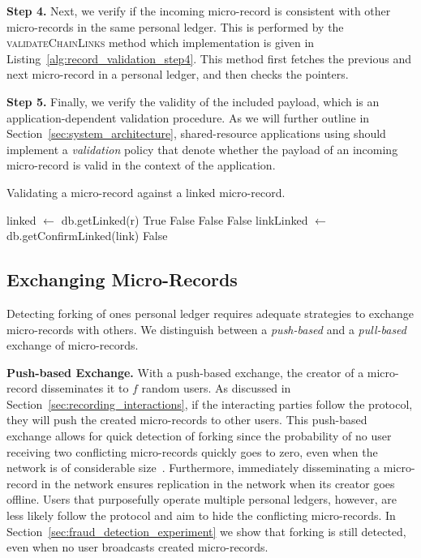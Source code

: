 \textbf{Step 4.}
Next, we verify if the incoming micro-record is consistent with other micro-records in the same personal ledger.
This is performed by the \textsc{validateChainLinks} method which implementation is given in Listing~\ref{alg:record_validation_step4}.
This method first fetches the previous and next micro-record in a personal ledger, and then checks the pointers.

\textbf{Step 5.}
Finally, we verify the validity of the included payload, which is an application-dependent validation procedure.
As we will further outline in Section~\ref{sec:system_architecture}, shared-resource applications using \ModelName{} should implement a \emph{validation} policy that denote whether the payload of an incoming micro-record is valid in the context of the application.

\begin{algorithm}[t]
	\label{alg:record_validation_step3}
	\caption{Validating a micro-record against a linked micro-record.}
	\begin{algorithmic}[1]
		  
		\State linked $ \leftarrow$ db.getLinked(r)
		\State \Return True
		\EndIf
		\State \Return False
		\EndIf
		\State \Return False
		\EndIf
		\State \Return False
		\EndIf
		\State linkLinked $ \leftarrow $ db.getConfirmLinked(link)
		\State \Return False
		\EndIf
		\EndIf
		\EndProcedure
	\end{algorithmic}
\end{algorithm}

\subsection{Exchanging Micro-Records}
\label{sec:exchanging_records}
Detecting forking of ones personal ledger requires adequate strategies to exchange micro-records with others.
We distinguish between a \emph{push-based} and a \emph{pull-based} exchange of micro-records.

\textbf{Push-based Exchange.}
With a push-based exchange, the creator of a micro-record disseminates it to $ f $ random users.
As discussed in Section~\ref{sec:recording_interactions}, if the interacting parties follow the protocol, they will push the created micro-records to other users.
This push-based exchange allows for quick detection of forking since the probability of no user receiving two conflicting micro-records quickly goes to zero, even when the network is of considerable size~\cite{osipkov2007combating}.
Furthermore, immediately disseminating a micro-record in the network ensures replication in the network when its creator goes offline.
Users that purposefully operate multiple personal ledgers, however, are less likely follow the protocol and aim to hide the conflicting micro-records.
In Section~\ref{sec:fraud_detection_experiment} we show that forking is still detected, even when no user broadcasts created micro-records.

